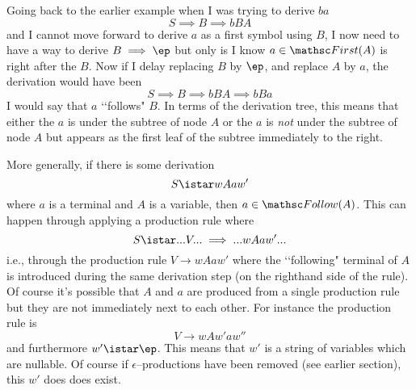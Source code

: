 Going back to the earlier example when I was trying to derive $ba$
\[
S \implies B \implies bBA
\]
and I cannot move forward to derive $a$ as a first symbol using $B$,
I now need to have a way to derive $B \implies \ep$ but only is I know
$a \in \FIRST(A)$ is right after the $B$.
Now if I delay replacing $B$ by $\ep$, and replace $A$ by $a$,
the derivation would have been
\[
S \implies B \implies bBA \implies bBa
\]
I would say that $a$ \lq\lq follows" $B$.
In terms of the derivation tree, this means that either the $a$
is under the subtree of node $A$ or the $a$ is \textit{not} under the subtree
of node $A$ but appears as the first leaf of the subtree immediately to the right.

More generally, if there is some derivation
\[
S \istar wAaw'
\]
where $a$ is a terminal and $A$ is a variable, then $a \in \FOLLOW(A)$.
This can happen through applying a production rule where
\[
S \istar ... V ... \implies ... wAaw' ...
\]
i.e., through the production rule $V \rightarrow wAaw'$ where the
\lq\lq following"
terminal of $A$ is introduced during the same derivation step (on the righthand
side of the rule).
Of course it's possible that $A$ and $a$ are produced from a single production
rule but they are not immediately next to each other.
For instance the production rule is
\[
V \rightarrow wAw'aw''
\]
and furthermore $w' \istar \ep$. This means that $w'$ is a string of
variables which are nullable.
Of course if $\epsilon$--productions have been removed (see earlier section),
this $w'$ does does exist.

